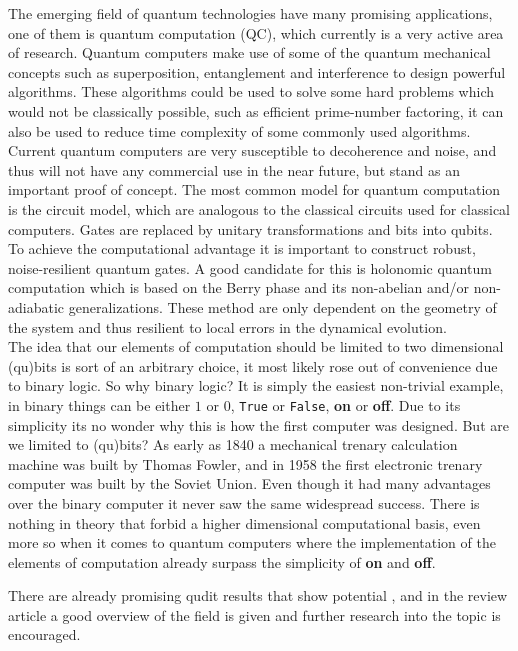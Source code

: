 The emerging field of quantum technologies have many promising applications, one of them is quantum computation (QC), which currently is a very active area of research. Quantum computers make use of some of the quantum mechanical concepts such as superposition, entanglement and interference to design powerful algorithms. These algorithms could be used to solve some hard problems which would not be classically possible, such as efficient prime-number factoring\cite{shor}, it can also be used to reduce time complexity of some commonly used algorithms\cite{Grover}. Current quantum computers are very susceptible to decoherence and noise, and thus will not have any commercial use in the near future, but stand as an important proof of concept. 
The most common model for quantum computation is the circuit model, which are analogous to the classical circuits used for classical computers. Gates are replaced by unitary transformations and bits into qubits. To achieve the computational advantage it is important to construct robust, noise-resilient quantum gates. A good candidate for this is holonomic quantum computation\cite{HQC,NHQC} which is based on the Berry phase\cite{berry} and its non-abelian and/or non-adiabatic generalizations\cite{anandan1,anandan2,zee}. These method are only dependent on the geometry of the system and thus resilient to local errors in the dynamical evolution.
\\
The idea that our elements of computation should be limited to two dimensional (qu)bits is sort of an arbitrary choice, it most likely rose out of convenience due to binary logic. So why binary logic? It is simply the easiest non-trivial example, in binary things can be either $1$ or $0$, {\tt True} or {\tt False}, \textbf{on} or \textbf{off}. Due to its simplicity its no wonder why this is how the first computer was designed. But are we limited to (qu)bits? As early as 1840 a mechanical trenary calculation machine was built by Thomas Fowler\cite{tricalc}, and in 1958 the first electronic trenary computer was built by the Soviet Union\cite{setun}. Even though it had many advantages over the binary computer it never saw the same widespread success. There is nothing in theory that forbid a higher dimensional computational basis, even more so when it comes to quantum computers where the implementation of the elements of computation already surpass the simplicity of \textbf{on} and \textbf{off}. 

There are already promising qudit results that show potential \cite{qutrit1,qudit2,qudit3}, and in the review article \cite{qudit} a good overview of the field is given and further research into the topic is encouraged.


